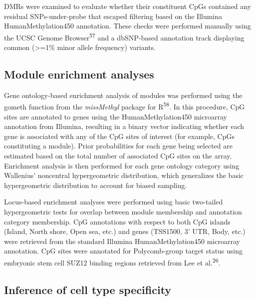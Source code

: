 \documentclass[]{article}
\theoremstyle{definition}
\theoremstyle{definition}
\theoremstyle{definition}
\theoremstyle{remark}
\begin{document}
DMRs were examined to evaluate whether their constituent CpGs contained
any residual SNPs-under-probe that escaped filtering based on the
Illumina HumanMethylation450 annotation. These checks were performed
manually using the UCSC Genome Browser\textsuperscript{57} and a
dbSNP-based annotation track displaying common (\textgreater{}=1\% minor
allele frequency) variants.

\subsection{Module enrichment
analyses}\label{module-enrichment-analyses}

Gene ontology-based enrichment analysis of modules was performed using
the gometh function from the \emph{missMethyl} package for
R\textsuperscript{58}. In this procedure, CpG sites are annotated to
genes using the HumanMethylation450 microarray annotation from Illumina,
resulting in a binary vector indicating whether each gene is associated
with any of the CpG sites of interest (for example, CpGs constituting a
module). Prior probabilities for each gene being selected are estimated
based on the total number of associated CpG sites on the array.
Enrichment analysis is then performed for each gene ontology category
using Wallenius' noncentral hypergeometric distribution, which
generalizes the basic hypergeometric distribution to account for biased
sampling.

Locus-based enrichment analyses were performed using basic two-tailed
hypergeometric tests for overlap between module membership and
annotation category membership. CpG annotations with respect to both CpG
islands (Island, North shore, Open sea, etc.) and genes (TSS1500, 3'
UTR, Body, etc.) were retrieved from the standard Illumina
HumanMethylation450 microarray annotation. CpG sites were annotated for
Polycomb-group target status using embryonic stem cell SUZ12 binding
regions retrieved from Lee et al.\textsuperscript{26}.

\subsection{Inference of cell type
specificity}\label{inference-of-cell-type-specificity}
\end{document}
